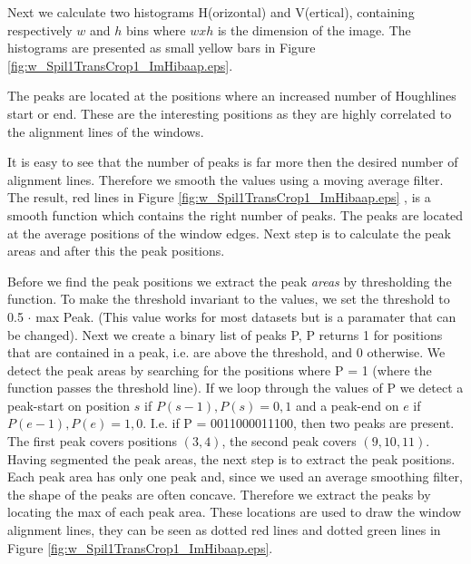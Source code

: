 Next we calculate two histograms H(orizontal) and V(ertical), containing respectively
$w$ and $h$ bins where $w x h$ is the dimension of the image.  The histograms
are presented as small yellow bars in Figure \ref{fig:w_Spil1TransCrop1_ImHibaap.eps}.

The peaks are located at the positions where an increased number of Houghlines
start or end.  These are the interesting positions as they are highly correlated
to the alignment lines of the windows. 

It is easy to see that the number of peaks is far more then the desired number of alignment lines.
Therefore we smooth the values using a moving average filter.
The result, red lines in Figure \ref{fig:w_Spil1TransCrop1_ImHibaap.eps}
, is a smooth function which contains the right number of peaks. The peaks
are located at the average positions of the window edges. Next step is to
calculate the peak areas and after this the peak positions. 

Before we find the peak positions we extract the peak \emph{areas} by thresholding the
function. To make the threshold invariant to the values, we set the threshold to 0.5 $\cdot$ max Peak. 
(This value works for most datasets but is a paramater that can be changed).
Next we create a binary list of peaks P, P returns 1 for positions that are contained in
a peak, i.e. are above the threshold, and 0 otherwise.
We detect the peak areas by searching for the positions where P = 1
(where the function passes the threshold line). 
If we loop through the values of P we detect a peak-start on position $s$ if ${P(s-1),P(s)}={0,1}$
and a peak-end on $e$ if ${P(e-1),P(e)}={1,0}$. 
I.e. if P = 0011000011100, then two peaks are present. The first peak covers positions $(3,4)$, 
the second peak covers $(9,10,11)$.\\

Having segmented the peak areas, the next step is to extract the peak positions. 
Each peak area has only one peak and, since we used an average smoothing filter, the shape of 
the peaks are often concave. Therefore we extract the peaks by locating the max of each peak area. 
These locations are used to draw the window alignment lines, they can be seen
as dotted red lines and dotted green lines in Figure \ref{fig:w_Spil1TransCrop1_ImHibaap.eps}.


